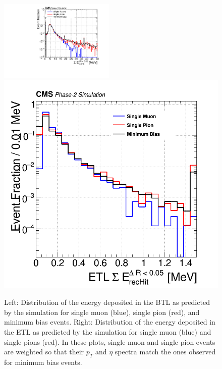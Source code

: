 \begin{figure}[hbtp]
\centering
\includegraphics[width=0.49\textwidth]{fig/performance/c_all_Edep.pdf}
\includegraphics[width=0.45\linewidth]{fig/performance/h_3_recHit_energy_dR05_withTrackETL.png}
\caption{Left: Distribution of the energy deposited in the BTL as predicted by the simulation for single muon (blue), single pion (red), and minimum bias events. 
Right: Distribution of the energy deposited in the ETL as predicted by the simulation for single muon (blue) and single pions (red). 
In these plots, single muon and single pion events are weighted so that their $p_{T}$ and $\eta$ spectra match the ones observed for minimum bias events. 
}
\label{fig:BTL_Edep}
\end{figure}

